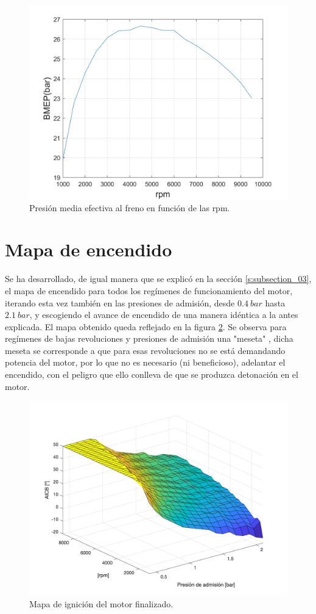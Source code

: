 \begin{figure}[H]
    \centering
    \includegraphics[width=0.6\linewidth]{Figures/01/BMEP.jpg}
    \caption{Presión media efectiva al freno en función de las rpm.}
    \label{fig:RPM_bmep}
\end{figure}

\section{Mapa de encendido} \label{s:section_07}

Se ha desarrollado, de igual manera que se explicó en la sección \ref{s:subsection_03}, el mapa de encendido para todos los regímenes de funcionamiento del motor, iterando esta vez también en las presiones de admisión, desde $0.4\ bar$ hasta $2.1\ bar$, y escogiendo el avance de encendido de una manera idéntica a la antes explicada. El mapa obtenido queda reflejado en la figura \ref{fig:mapa_completo}. Se observa para regímenes de bajas revoluciones y presiones de admisión una  "meseta" , dicha meseta se corresponde a que para esas revoluciones no se está demandando potencia del motor, por lo que no es necesario (ni beneficioso), adelantar el encendido, con el peligro que ello conlleva de que se produzca detonación en el motor.

\begin{figure}[H]
    \centering
    \includegraphics[width=0.6\linewidth]{Figures/01/ignitionmap.jpg}
    \caption{Mapa de ignición del motor finalizado.}
    \label{fig:mapa_completo}
\end{figure}

